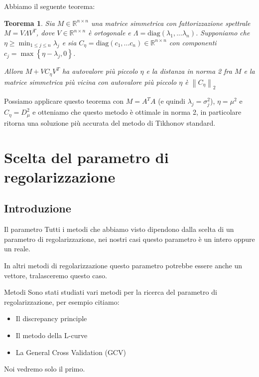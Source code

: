 \documentclass{beamer}
\newcounter{counter1}
\theoremstyle{plain}
\newtheorem{myteo}[counter1]{Teorema}
\theoremstyle{definition}
\theoremstyle{remark}
\newcommand{\set}[1]{\left\{#1\right\}}
\newcommand{\pa}[1]{\left(#1\right)}
\newcommand{\norm}[1]{\left\|#1\right\|}
\begin{document}
\begin{frame}
  Abbiamo il seguente teorema:
  \begin{myteo}
    Sia $M \in \mathbb{R}^{n\times n}$ una matrice simmetrica con
    fattorizzazione spettrale $M = V \Lambda V^T$, dove $V \in
    \mathbb{R}^{n \times n}$ è ortogonale e  $\Lambda = \mathrm{diag} \pa{
      \lambda _1, ... \lambda _n}$. Supponiamo che  $\eta \ge \min _{1\le
      j\le n} \lambda _j$ e sia $C_\eta = \mathrm{diag}
    \pa{ c_1 , ... c_n}\in \mathbb{R}^{n\times n}$ con componenti $c_j
    = \max \set{\eta - \lambda _j, 0}$.
    
    Allora $M + V C_\eta V^T$ ha autovalore più piccolo $\eta$
    e la distanza in norma 2 fra $M$ e la matrice simmetrica più vicina
    con autovalore più piccolo $\eta$ è $\norm{ C_\eta }_2$
  \end{myteo}
  
  Possiamo applicare questo teorema con $M = A^T A$ (e quindi $\lambda
  _j = \sigma _j ^2$), $\eta = \mu ^2$ e $C_\eta = D_\mu ^2$
  e otteniamo che questo metodo è ottimale in norma 2, in particolare
  ritorna una soluzione più accurata del metodo di Tikhonov standard.
\end{frame}

\section{Scelta del parametro di regolarizzazione}

\subsection{Introduzione}

\begin{frame}{Il parametro}
  Tutti i metodi che abbiamo visto dipendono dalla scelta di un
  parametro di regolarizzazione, nei nostri casi questo parametro è un
  intero oppure un reale.
  \vfill

  In altri metodi di regolarizzazione questo parametro potrebbe essere
  anche un vettore, tralasceremo questo caso.
\end{frame}

\begin{frame}{Metodi}
  Sono stati studiati vari metodi per la ricerca del parametro di
  regolarizzazione, per esempio citiamo:
  \begin{itemize}
  \item Il discrepancy principle
  \item Il metodo della L-curve
  \item La General Cross Validation (GCV)
  \end{itemize}
  \vfill
  
  Noi vedremo solo il primo.
\end{frame}
\end{document}
